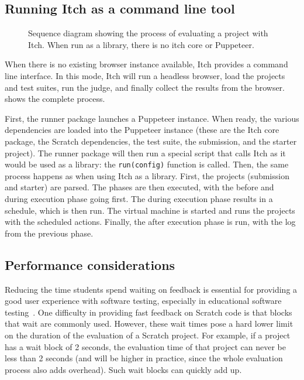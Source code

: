 \documentclass[../main]{subfiles}
\begin{document}
\subsection{Running Itch as a command line tool}\label{subsec:running-itch-as-a-command-line-tool}

\begin{figure}
    \begin{wide}
        
    \end{wide}
    \caption{Sequence diagram showing the process of evaluating a project with Itch. When run as a library, there is no itch core or Puppeteer.}
    \label{fig:itch-sequence-diagram}
\end{figure}

When there is no existing browser instance available, Itch provides a command line interface.
In this mode, Itch will run a headless browser, load the projects and test suites, run the judge, and finally collect the results from the browser.
 shows the complete process.

First, the runner package launches a Puppeteer instance.
When ready, the various dependencies are loaded into the Puppeteer instance (these are the Itch core package, the Scratch dependencies, the test suite, the submission, and the starter project).
The runner package will then run a special script that calls Itch as it would be used as a library: the \texttt{run(config)} function is called.
Then, the same process happens as when using Itch as a library.
First, the projects (submission and starter) are parsed.
The phases are then executed, with the before and during execution phase going first.
The during execution phase results in a schedule, which is then run.
The virtual machine is started and runs the projects with the scheduled actions.
Finally, the after execution phase is run, with the log from the previous phase.

\subsection{Performance considerations}\label{subsec:performance-considerations}

Reducing the time students spend waiting on feedback is essential for providing a good user experience with software testing, especially in educational software testing~\autocite{sarsaSpeedingAutomatedAssessment2022}.
One difficulty in providing fast feedback on Scratch code is that blocks that wait are commonly used.
However, these wait times pose a hard lower limit on the duration of the evaluation of a Scratch project.
For example, if a project has a wait block of 2 seconds, the evaluation time of that project can never be less than 2 seconds (and will be higher in practice, since the whole evaluation process also adds overhead).
Such wait blocks can quickly add up.
\end{document}
